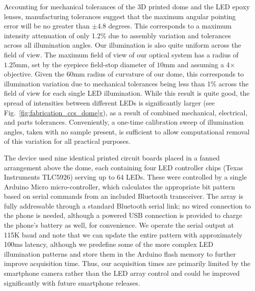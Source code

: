 Accounting for mechanical tolerances of the 3D printed dome and the LED epoxy lenses, manufacturing tolerances suggest that the maximum angular pointing error will be no greater than $\pm$4.8 degrees. This corresponds to a maximum intensity attenuation of only 1.2\% due to assembly variation and tolerances across all illumination angles. Our illumination is also quite uniform across the field of view. The maximum field of view of our optical system has a radius of $1.25\textrm{mm}$, set by the eyepiece field-stop diameter of $10\textrm{mm}$ and assuming a 4$\times$ objective. Given the $60\textrm{mm}$ radius of curvature of our dome, this corresponds to illumination variation due to mechanical tolerances being less than 1\% across the field of view for each single LED illumination.  While this result is quite good, the spread of intensities between different LEDs is significantly larger (see Fig.~\ref{fig:fabrication_ccs_dome}g), as a result of combined mechanical, electrical, and parts tolerances. Conveniently, a one-time calibration sweep of illumination angles, taken with no sample present, is sufficient to allow computational removal of this variation for all practical purposes.

The device used nine identical printed circuit boards placed in a fanned arrangement above the dome, each containing four LED controller chips (Texas Instruments TLC5926) serving up to 64 LEDs. These were controlled by a single Arduino Micro micro-controller, which calculates the appropriate bit pattern based on serial commands from an included Bluetooth transceiver. The array is fully addressable through a standard Bluetooth serial link; no wired connection to the phone is needed, although a powered USB connection is provided to charge the phone's battery as well, for convenience. We operate the serial output at 115K baud and note that we can update the entire pattern with approximately 100ms latency, although we predefine some of the more complex LED illumination patterns and store them in the Arduino flash memory to further improve acquisition time. Thus, our acquisition times are primarily limited by the smartphone camera rather than the LED array control and could be improved significantly with future smartphone releases.

